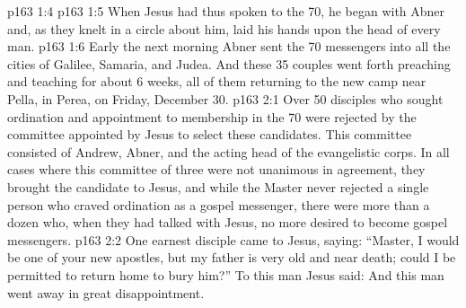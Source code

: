 \vs p163 1:4 
\vs p163 1:5 When Jesus had thus spoken to the 70, he began with Abner and, as they knelt in a circle about him, laid his hands upon the head of every man.
\vs p163 1:6 Early the next morning Abner sent the 70 messengers into all the cities of Galilee, Samaria, and Judea. And these 35 couples went forth preaching and teaching for about 6 weeks, all of them returning to the new camp near Pella, in Perea, on Friday, December 30.
\vs p163 2:1 Over 50 disciples who sought ordination and appointment to membership in the 70 were rejected by the committee appointed by Jesus to select these candidates. This committee consisted of Andrew, Abner, and the acting head of the evangelistic corps. In all cases where this committee of three were not unanimous in agreement, they brought the candidate to Jesus, and while the Master never rejected a single person who craved ordination as a gospel messenger, there were more than a dozen who, when they had talked with Jesus, no more desired to become gospel messengers.
\vs p163 2:2 \pc One earnest disciple came to Jesus, saying: “Master, I would be one of your new apostles, but my father is very old and near death; could I be permitted to return home to bury him?” To this man Jesus said:  And this man went away in great disappointment.

